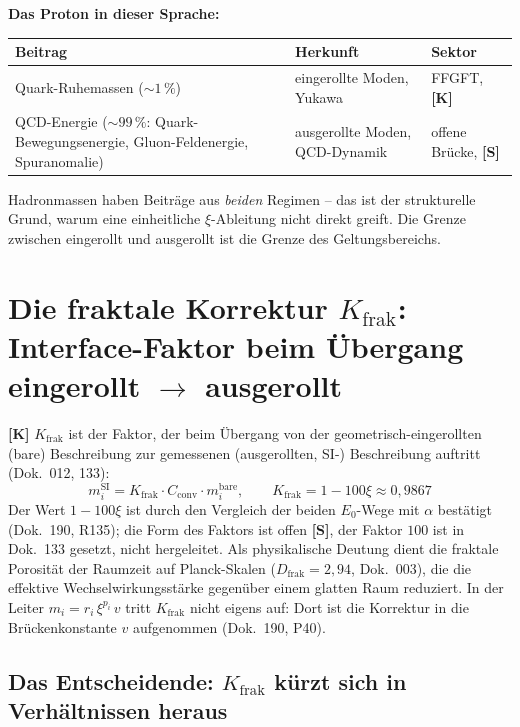 \textbf{Das Proton in dieser Sprache:}
\begin{center}
\begin{tabular}{lll}
\toprule
Beitrag & Herkunft & Sektor \\
\midrule
Quark-Ruhemassen ($\sim 1\,\%$) & eingerollte Moden, Yukawa
  & FFGFT, \textbf{[K]} \\
QCD-Energie ($\sim 99\,\%$: Quark-Bewegungsenergie, Gluon-Feldenergie, Spuranomalie) & ausgerollte Moden, QCD-Dynamik
  & offene Brücke, \textbf{[S]} \\
\bottomrule
\end{tabular}
\end{center}

Hadronmassen haben Beiträge aus \emph{beiden} Regimen -- das ist der
strukturelle Grund, warum eine einheitliche $\xi$-Ableitung nicht
direkt greift. Die Grenze zwischen eingerollt und ausgerollt ist die
Grenze des Geltungsbereichs.

\section{Die fraktale Korrektur $K_{\text{frak}}$: Interface-Faktor beim Übergang eingerollt $\to$ ausgerollt}

\textbf{[K]} $K_{\text{frak}}$ ist der Faktor, der beim Übergang von
der geometrisch-eingerollten (bare) Beschreibung zur gemessenen
(ausgerollten, SI-) Beschreibung auftritt (Dok.~012, 133):
\begin{equation}
  m_i^{\text{SI}} = K_{\text{frak}} \cdot C_{\text{conv}} \cdot m_i^{\text{bare}},
  \qquad K_{\text{frak}} = 1 - 100\xi \approx 0{,}9867
\end{equation}
Der Wert $1 - 100\xi$ ist durch den Vergleich der beiden $E_0$-Wege mit
$\alpha$ bestätigt (Dok.~190, R135); die Form des Faktors ist offen
\textbf{[S]}, der Faktor $100$ ist in Dok.~133 gesetzt, nicht hergeleitet.
Als physikalische Deutung dient die fraktale Porosität der Raumzeit
auf Planck-Skalen ($D_{\text{frak}} = 2{,}94$, Dok.~003), die die
effektive Wechselwirkungsstärke gegenüber einem glatten Raum reduziert.
In der Leiter $m_i = r_i\,\xi^{p_i}\,v$ tritt $K_{\text{frak}}$ nicht
eigens auf: Dort ist die Korrektur in die Brückenkonstante $v$
aufgenommen (Dok.~190, P40).

\subsection{Das Entscheidende: $K_{\text{frak}}$ kürzt sich in Verhältnissen heraus}


